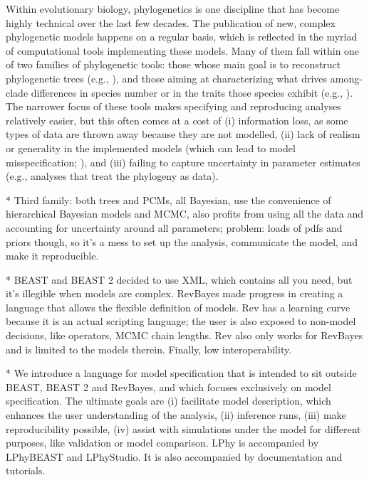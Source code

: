 \documentclass[10pt,letterpaper,table]{article}
\begin{document}
Within evolutionary biology, phylogenetics is one discipline that has
become highly technical over the last few decades.
The publication of new, complex phylogenetic models happens on a
regular basis, which is reflected in the myriad of computational tools
implementing these models.
Many of them fall within one of two families of phylogenetic tools:
those whose main goal is to reconstruct phylogenetic trees 
(e.g., \cite{mpest,phyml,svdquartets,raxml,iqtree,astral3,svdquest}),
and those aiming at characterizing what drives among-clade differences
 in species number or in the traits those species exhibit (e.g.,
\cite{diversitree,phytools,bamm,geiger,mvmorph,rpanda,bite,cafe}).
The narrower focus of these tools makes specifying and reproducing
analyses relatively easier, but this often comes at a cost of (i)
information loss, as some types of data are thrown away because they
are not modelled, (ii) lack of realism or generality in the
implemented models (which can lead to model misspecification;
\cite{mendes17,mendes18}), and (iii) failing to capture uncertainty in  
parameter estimates (e.g., analyses that treat the phylogeny as data).

* Third family: both trees and PCMs, all Bayesian, use the convenience
of hierarchical Bayesian models and MCMC, also profits from using all
the data and accounting for uncertainty around all parameters;
problem: loads of pdfs and priors though, so it's a mess to set up the
analysis, communicate the model, and make it reproducible.

* BEAST and BEAST 2 decided to use XML, which contains all you need,
but it's illegible when models are complex. RevBayes made progress in
creating a language that allows the flexible definition of models.
Rev has a learning curve because it is an actual scripting language;
the user is also exposed to non-model decisions, like operators, MCMC
chain lengths. Rev also only works for RevBayes and is limited to the
models therein.
Finally, low interoperability.

* We introduce a language for model specification that is intended to
sit outside BEAST, BEAST 2 and RevBayes, and which focuses exclusively
on model specification.
The ultimate goals are (i) facilitate model description, which enhances
the user understanding of the analysis, (ii) inference runs, (iii)
make reproducibility possible, (iv) assist with simulations under the
model for different purposes, like validation or model comparison.
LPhy is accompanied by LPhyBEAST and LPhyStudio.
It is also accompanied by documentation and tutorials.
\end{document}
